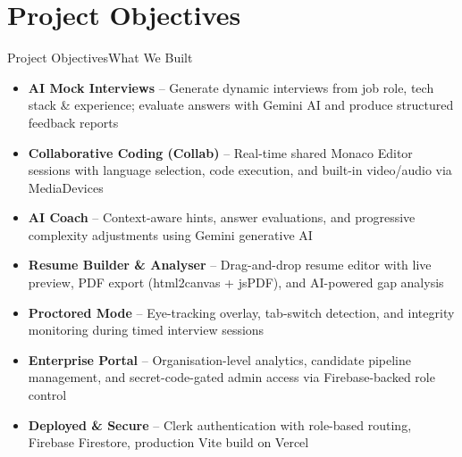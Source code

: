 \documentclass{beamer}
\begin{document}
\section{Project Objectives}
\begin{frame}{Project Objectives}{What We Built}
\small
\begin{itemize}
    \item \textbf{AI Mock Interviews} -- Generate dynamic interviews from job role, tech stack \& experience; evaluate answers with Gemini AI and produce structured feedback reports

    \item \textbf{Collaborative Coding (Collab)} -- Real-time shared Monaco Editor sessions with language selection, code execution, and built-in video/audio via MediaDevices

    \item \textbf{AI Coach} -- Context-aware hints, answer evaluations, and progressive complexity adjustments using Gemini generative AI

    \item \textbf{Resume Builder \& Analyser} -- Drag-and-drop resume editor with live preview, PDF export (html2canvas + jsPDF), and AI-powered gap analysis

    \item \textbf{Proctored Mode} -- Eye-tracking overlay, tab-switch detection, and integrity monitoring during timed interview sessions

    \item \textbf{Enterprise Portal} -- Organisation-level analytics, candidate pipeline management, and secret-code-gated admin access via Firebase-backed role control

    \item \textbf{Deployed \& Secure} -- Clerk authentication with role-based routing, Firebase Firestore, production Vite build on Vercel
\end{itemize}
\end{frame}

\end{document}
